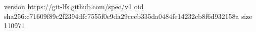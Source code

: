 version https://git-lfs.github.com/spec/v1
oid sha256:c71609f89c2f2394dfc7555f0c9da29cccb335da0484fe14232cb8f6d932158a
size 110971
